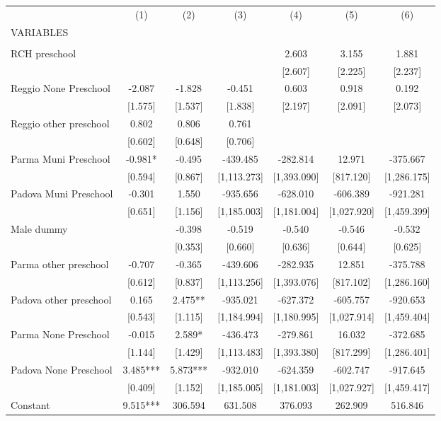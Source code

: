 \begin{tabular}{lcccccc} \hline
 & (1) & (2) & (3) & (4) & (5) & (6) \\
VARIABLES &  &  &  &  &  &  \\ \hline
 &  &  &  &  &  &  \\
RCH preschool &  &  &  & 2.603 & 3.155 & 1.881 \\
 &  &  &  & [2.607] & [2.225] & [2.237] \\
Reggio None Preschool & -2.087 & -1.828 & -0.451 & 0.603 & 0.918 & 0.192 \\
 & [1.575] & [1.537] & [1.838] & [2.197] & [2.091] & [2.073] \\
Reggio other preschool & 0.802 & 0.806 & 0.761 &  &  &  \\
 & [0.602] & [0.648] & [0.706] &  &  &  \\
Parma Muni Preschool & -0.981* & -0.495 & -439.485 & -282.814 & 12.971 & -375.667 \\
 & [0.594] & [0.867] & [1,113.273] & [1,393.090] & [817.120] & [1,286.175] \\
Padova Muni Preschool & -0.301 & 1.550 & -935.656 & -628.010 & -606.389 & -921.281 \\
 & [0.651] & [1.156] & [1,185.003] & [1,181.004] & [1,027.920] & [1,459.399] \\
Male dummy &  & -0.398 & -0.519 & -0.540 & -0.546 & -0.532 \\
 &  & [0.353] & [0.660] & [0.636] & [0.644] & [0.625] \\
Parma other preschool & -0.707 & -0.365 & -439.606 & -282.935 & 12.851 & -375.788 \\
 & [0.612] & [0.837] & [1,113.256] & [1,393.076] & [817.102] & [1,286.160] \\
Padova other preschool & 0.165 & 2.475** & -935.021 & -627.372 & -605.757 & -920.653 \\
 & [0.543] & [1.115] & [1,184.994] & [1,180.995] & [1,027.914] & [1,459.404] \\
Parma None Preschool & -0.015 & 2.589* & -436.473 & -279.861 & 16.032 & -372.685 \\
 & [1.144] & [1.429] & [1,113.483] & [1,393.380] & [817.299] & [1,286.401] \\
Padova None Preschool & 3.485*** & 5.873*** & -932.010 & -624.359 & -602.747 & -917.645 \\
 & [0.409] & [1.152] & [1,185.005] & [1,181.003] & [1,027.927] & [1,459.417] \\
Constant & 9.515*** & 306.594 & 631.508 & 376.093 & 262.909 & 516.846 \\

\end{tabular}

